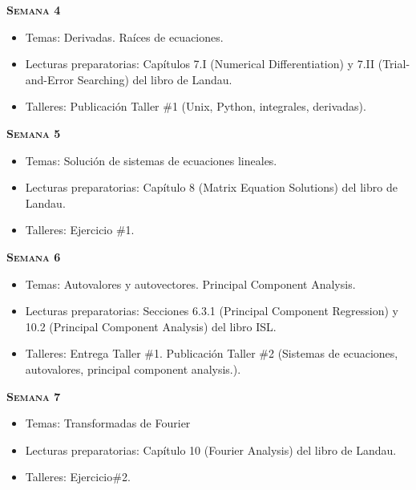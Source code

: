 \documentclass[letterpaper,10pt,onecolumn]{article}
\begin{document}
\noindent\textbf{\textsc{Semana 4}}\\[-0.5cm]
\begin{itemize}
\item Temas: Derivadas. Ra\'ices de ecuaciones. \\[-0.6cm]
\item Lecturas preparatorias: Cap\'itulos 7.I (Numerical
  Differentiation) y 7.II (Trial-and-Error Searching) del libro de
  Landau.\\[-0.6cm] \item Talleres: Publicaci\'on Taller \#1 (Unix,
  Python, integrales,  derivadas). \\[-0.6cm] 
\end{itemize}

\noindent\textbf{\textsc{Semana 5}}\\[-0.5cm]
\begin{itemize}
\item Temas: Soluci\'on de sistemas de ecuaciones lineales.\\[-0.6cm] 
\item Lecturas preparatorias:  Cap\'itulo 8 (Matrix Equation Solutions)
  del libro de Landau. \\[-0.6cm]
\item Talleres: Ejercicio \#1. \\[-0.6cm]
\end{itemize}

\noindent\textbf{\textsc{Semana 6}}\\[-0.5cm]
\begin{itemize}
\item Temas: Autovalores y autovectores. Principal Component
  Analysis. \\[-0.6cm]
\item Lecturas preparatorias: Secciones 6.3.1 (Principal Component
  Regression) y 10.2 (Principal Component Analysis) del libro ISL.\\[-0.6cm]
\item Talleres: Entrega Taller \#1. Publicaci\'on Taller \#2 (Sistemas
  de ecuaciones, autovalores, principal component analysis.).\\[-0.6cm]
\end{itemize}

\noindent\textbf{\textsc{Semana 7}}\\[-0.5cm]
\begin{itemize}
\item Temas: Transformadas de Fourier\\[-0.6cm]
\item Lecturas preparatorias: Cap\'itulo 10 (Fourier Analysis) del
  libro de Landau.\\[-0.6cm] 
\item Talleres: Ejercicio\#2. \\[-0.6cm]
\end{itemize}
\end{document}
